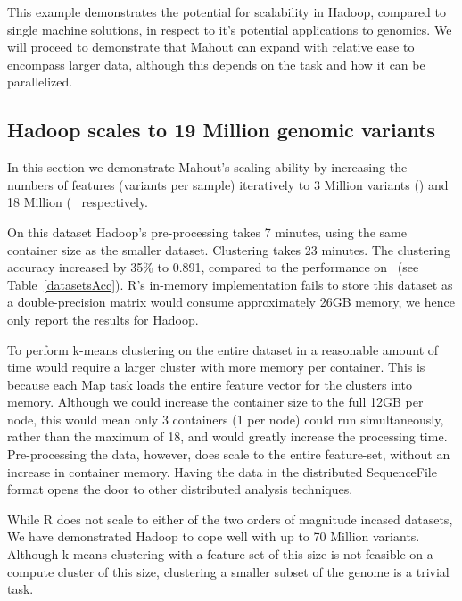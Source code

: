 \documentclass{bioinfo}
\begin{document}
This example demonstrates the potential for scalability in Hadoop, compared to single machine solutions, in respect to it's potential applications to genomics. 
We will proceed to demonstrate that Mahout can expand with relative ease to encompass larger data, although this depends on the task and how it can be parallelized.


\subsection*{Hadoop scales to 19 Million genomic variants}
In this section we demonstrate Mahout's scaling ability by increasing the numbers of features (variants per sample) iteratively to 3 Million variants (\OnePhaseone) and 18 Million ( \SevenPhaseone\, respectively. 

On this dataset Hadoop's pre-processing takes 7 minutes, using the same container size as the smaller dataset. Clustering takes 23 minutes.
The clustering accuracy increased by 35\% to 0.891, compared to the performance on \NinteenPhaseone\ (see Table~\ref{datasetsAcc}).
R's in-memory implementation fails to store this dataset as a double-precision matrix would consume approximately 26GB memory, we hence only
report the results for Hadoop.

To perform k-means clustering on the entire dataset in a reasonable amount of time would require a larger cluster with more memory per container.
This is because each Map task loads the entire feature vector for the clusters into memory.
Although we could increase the container size to the full 12GB per node, this would mean only 3 containers (1 per node) could run simultaneously, rather than the maximum of 18, and would greatly increase the processing time.
Pre-processing the data, however, does scale to the entire feature-set, without an increase in container memory. Having the data in the distributed
SequenceFile format opens the door to other distributed analysis techniques.

While R does not scale to either of the two orders of magnitude incased datasets, We have demonstrated Hadoop to cope well with up to 70 Million variants. Although k-means clustering with a feature-set of this size is not feasible on a compute cluster of this size, clustering a smaller subset of the genome is a trivial task.

\end{document}
